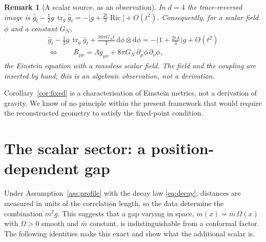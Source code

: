 \documentclass[11pt,a4paper]{article}
\theoremstyle{stmt}
\theoremstyle{defn}
\theoremstyle{rmk}
\newtheorem{remark}[theorem]{Remark}
\numberwithin{equation}{section}
\DeclareMathOperator{\tr}{tr}
\DeclareMathOperator{\Ric}{Ric}
\newcommand{\dd}{\mathrm{d}}
\begin{document}
\begin{remark}[A scalar source, as an observation]
In $d=4$ the trace-reversed image is $\hat g_t-\tfrac12g\,\tr_g\hat g_t=-\big[g+\tfrac{2t}{3}\Ric\big]+O(t^2)$. Consequently, for a scalar field $\phi$ and a constant $G_N$,
\begin{equation}
\begin{gathered}
\hat g_t-\tfrac12g\,\tr_g\hat g_t+\frac{16\pi G_Nt}{3}\,\dd\phi\otimes\dd\phi=-\Big(1+\frac{2t\Lambda}{3}\Big)g+O(t^2)\\
\Longleftrightarrow\qquad R_{\mu\nu}=\Lambda g_{\mu\nu}+8\pi G_N\,\partial_\mu\phi\,\partial_\nu\phi ,
\end{gathered}
\end{equation}
the Einstein equation with a massless scalar field. The field and the coupling are inserted by hand; this is an algebraic observation, not a derivation.
\end{remark}

Corollary~\ref{cor:fixed} is a characterisation of Einstein metrics, not a derivation of gravity. We know of no principle within the present framework that would require the reconstructed geometry to satisfy the fixed-point condition.

\section{The scalar sector: a position-dependent gap}\label{sec:scalar}

Under Assumption~\ref{ass:profile} with the decay law \eqref{eq:decay}, distances are measured in units of the correlation length, so the data determine the combination $m^2g$. This suggests that a gap varying in space, $m(x)=\bar m\,\Omega(x)$ with $\Omega>0$ smooth and $\bar m$ constant, is indistinguishable from a conformal factor. The following identities make this exact and show what the additional scalar is.
\end{document}
